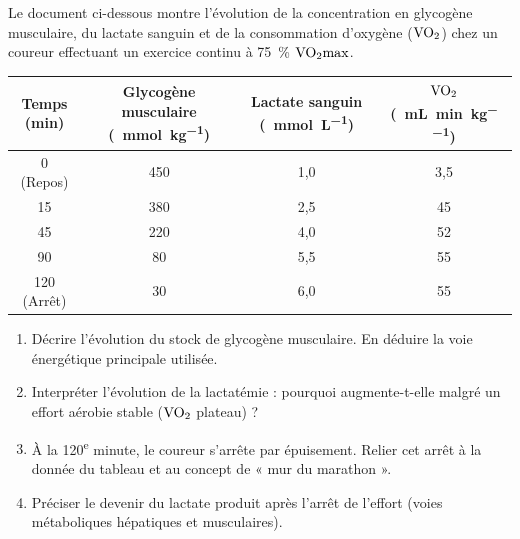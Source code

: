 \documentclass[11pt]{article}
\begin{document}
\begin{exercice}
Le document ci-dessous montre l'évolution de la concentration en glycogène musculaire, du lactate sanguin et de la consommation d'oxygène ($\ce{VO2}$) chez un coureur effectuant un exercice continu à \SI{75}{\%} $\ce{VO2max}$.

\begin{center}
\begin{tabular}{|c|c|c|c|}
\hline
\textbf{Temps (min)} & \textbf{Glycogène musculaire (\SI{}{\milli\mol\per\kilo\gram})} & \textbf{Lactate sanguin (\SI{}{\milli\mol\per\liter})} & \textbf{$\ce{VO2}$ (\SI{}{\milli\liter\per\minute\per\kilo\gram})} \\
\hline
0 (Repos) & 450 & 1,0 & 3,5 \\
\hline
15 & 380 & 2,5 & 45 \\
\hline
45 & 220 & 4,0 & 52 \\
\hline
90 & 80 & 5,5 & 55 \\
\hline
120 (Arrêt) & 30 & 6,0 & 55 \\
\hline
\end{tabular}
\end{center}

\begin{enumerate}
    \item Décrire l'évolution du stock de glycogène musculaire. En déduire la voie énergétique principale utilisée.
    \item Interpréter l'évolution de la lactatémie : pourquoi augmente-t-elle malgré un effort aérobie stable ($\ce{VO2}$ plateau) ?
    \item À la 120\textsuperscript{e} minute, le coureur s'arrête par épuisement. Relier cet arrêt à la donnée du tableau et au concept de « mur du marathon ».
    \item Préciser le devenir du lactate produit après l'arrêt de l'effort (voies métaboliques hépatiques et musculaires).
\end{enumerate}
\end{exercice}
\end{document}

